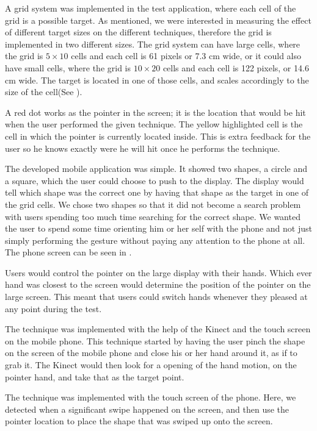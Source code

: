 A grid system was implemented in the test application, where each cell of the grid is a possible target. 
As mentioned, we were interested in measuring the effect of different target sizes on the different techniques, therefore the grid is implemented in two different sizes. 
The grid system can have large cells, where the grid is $5 \times 10$ cells and each cell is 61 pixels or 7.3 cm wide, or it could also have small cells, where the grid is $10 \times 20$ cells and each cell is 122 pixels, or 14.6 cm wide. 
The target is located in one of those cells, and scales accordingly to the size of the cell(See ).

A red dot works as the pointer in the screen; it is the location that would be hit when the user performed the given technique. 
The yellow highlighted cell is the cell in which the pointer is currently located inside. 
This is extra feedback for the user so he knows exactly were he will hit once he performs the technique.

The developed mobile application was simple. It showed two shapes, a circle and a square, which the user could choose to push to the display. The display would tell which shape was the correct one by having that shape as the target in one of the grid cells. We chose two shapes so that it did not become a search problem with users spending too much time searching for the correct shape. We wanted the user to spend some time orienting him or her self with the phone and not just simply performing the gesture without paying any attention to the phone at all. The phone screen can be seen in .

Users would control the pointer on the large display with their hands. 
Which ever hand was closest to the screen would determine the position of the pointer on the large screen. 
This meant that users could switch hands whenever they pleased at any point during the test. 

The \pinch technique was implemented with the help of the Kinect and the touch screen on the mobile phone. 
This technique started by having the user pinch the shape on the screen of the mobile phone and close his or her hand around it, as if to grab it. 
The Kinect would then look for a opening of the hand motion, on the pointer hand, and take that as the target point.

The \swipe technique was implemented with the touch screen of the phone. 
Here, we detected when a significant swipe happened on the screen, and then use the pointer location to place the shape that was swiped up onto the screen. 

